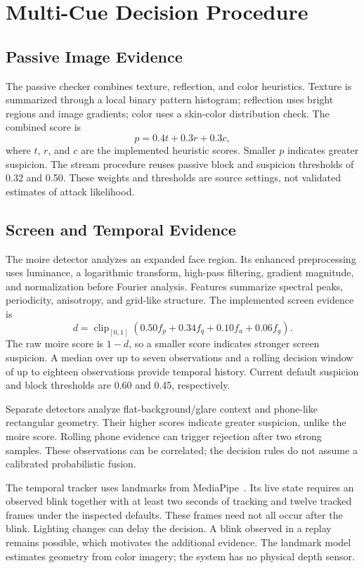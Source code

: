 \documentclass[conference,a4paper]{IEEEtran}
\begin{document}
\section{Multi-Cue Decision Procedure}
\subsection{Passive Image Evidence}
The passive checker combines texture, reflection, and color heuristics. Texture is summarized through a local binary pattern histogram; reflection uses bright regions and image gradients; color uses a skin-color distribution check. The combined score is
\begin{equation}
p=0.4t+0.3r+0.3c,
\end{equation}
where $t$, $r$, and $c$ are the implemented heuristic scores. Smaller $p$ indicates greater suspicion. The stream procedure reuses passive block and suspicion thresholds of 0.32 and 0.50. These weights and thresholds are source settings, not validated estimates of attack likelihood.

\subsection{Screen and Temporal Evidence}
The moire detector analyzes an expanded face region. Its enhanced preprocessing uses luminance, a logarithmic transform, high-pass filtering, gradient magnitude, and normalization before Fourier analysis. Features summarize spectral peaks, periodicity, anisotropy, and grid-like structure. The implemented screen evidence is
\begin{equation}
d=\operatorname{clip}_{[0,1]}(0.50f_p+0.34f_q+0.10f_a+0.06f_g).
\end{equation}
The raw moire score is $1-d$, so a smaller score indicates stronger screen suspicion. A median over up to seven observations and a rolling decision window of up to eighteen observations provide temporal history. Current default suspicion and block thresholds are 0.60 and 0.45, respectively.

Separate detectors analyze flat-background/glare context and phone-like rectangular geometry. Their higher scores indicate greater suspicion, unlike the moire score. Rolling phone evidence can trigger rejection after two strong samples. These observations can be correlated; the decision rules do not assume a calibrated probabilistic fusion.

The temporal tracker uses landmarks from MediaPipe~\cite{mediapipe}. Its live state requires an observed blink together with at least two seconds of tracking and twelve tracked frames under the inspected defaults. These frames need not all occur after the blink. Lighting changes can delay the decision. A blink observed in a replay remains possible, which motivates the additional evidence. The landmark model estimates geometry from color imagery; the system has no physical depth sensor.
\end{document}
